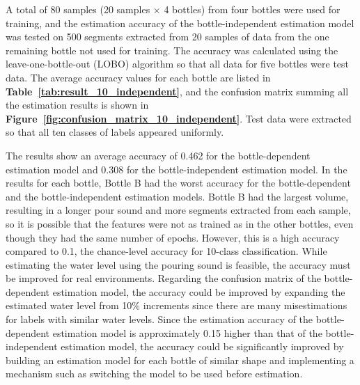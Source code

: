 \documentclass[sigconf]{acmart}
\newcommand\figref[1]{\textbf{Figure~\ref{fig:#1}}}
\newcommand\tabref[1]{\textbf{Table~\ref{tab:#1}}}
\begin{document}
A total of 80 samples (20 samples $\times$ 4 bottles) from four bottles were used for training, and the estimation accuracy of the bottle-independent estimation model was tested on 500 segments extracted from 20 samples of data from the one remaining bottle not used for training. The accuracy was calculated using the leave-one-bottle-out (LOBO) algorithm so that all data for five bottles were test data. The average accuracy values for each bottle are listed in \tabref{result_10_independent}, and the confusion matrix summing all the estimation results is shown in \figref{confusion_matrix_10_independent}. Test data were extracted so that all ten classes of labels appeared uniformly.\par

The results show an average accuracy of 0.462 for the bottle-dependent estimation model and 0.308 for the bottle-independent estimation model. In the results for each bottle, Bottle B had the worst accuracy for the bottle-dependent and the bottle-independent estimation models. Bottle B had the largest volume, resulting in a longer pour sound and more segments extracted from each sample, so it is possible that the features were not as trained as in the other bottles, even though they had the same number of epochs. However, this is a high accuracy compared to 0.1, the chance-level accuracy for 10-class classification. While estimating the water level using the pouring sound is feasible, the accuracy must be improved for real environments. Regarding the confusion matrix of the bottle-dependent estimation model, the accuracy could be improved by expanding the estimated water level from 10\% increments since there are many misestimations for labels with similar water levels. Since the estimation accuracy of the bottle-dependent estimation model is approximately 0.15 higher than that of the bottle-independent estimation model, the accuracy could be significantly improved by building an estimation model for each bottle of similar shape and implementing a mechanism such as switching the model to be used before estimation.
\end{document}
